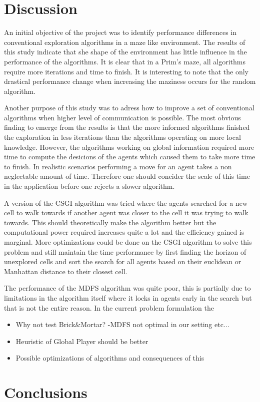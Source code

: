 \documentclass{article}
\begin{document}
\section{Discussion}

An initial objective of the project was to identify performance differences in
conventional exploration algorithms in a maze like environment. The results of
this study indicate that she shape of the environment has little influence in
the performance of the algorithms. It is clear that in a Prim's maze, all
algorithms require more iterations and time to finish. It is interesting to note
that the only drastical performance change when increasing the maziness occurs
for the random algorithm.

Another purpose of this study was to adress how to improve a set of conventional
algorithms when higher level of communication is possible. The most obvious
finding to emerge from the results is that the more informed algorithms finished
the exploration in less iterations than the algorithms operating on more local
knowledge. However, the algorithms working on global information required more
time to compute the desicions of the agents which caused them to take more time
to finish. In realistic scenarios performing a move for an agent takes a non
neglectable amount of time. Therefore one should concider the scale of this time
in the application before one rejects a slower algorithm.


A version of the CSGI algorithm was tried where the agents searched for a new cell to walk towards if another agent was closer to the cell it was trying to walk towards. This should theoretically make the algorithm better but the computational power required increases quite a lot and the efficiency gained is marginal. More optimizations could be done on the CSGI algorithm to solve this problem and still maintain the time performance by first finding the horizon of unexplored cells and sort the search for all agents based on their euclidean or Manhattan distance to their closest cell.

The performance of the MDFS algorithm was quite poor, this is partially due to
limitations in the algorithm itself where it locks in agents early in the
search but that is not the entire reason. In the current problem formulation the 

\begin{itemize}
    \item Why not test Brick\&Mortar? -MDFS not optimal in our setting etc...
    \item Heuristic of Global Player should be better
    \item Possible optimizations of algorithms and consequences of this
\end{itemize}

\section{Conclusions}




\end{document}
